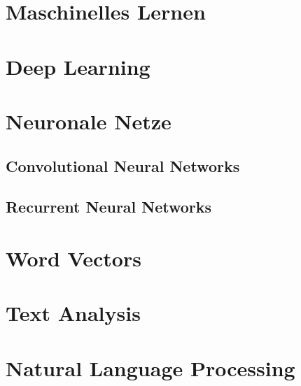 \section{Maschinelles Lernen}
\lipsum[1]

\section{Deep Learning}
\lipsum[2]

\section{Neuronale Netze}
\subsection{Convolutional Neural Networks}
\lipsum[3]
\subsection{Recurrent Neural Networks}
\lipsum[4]

\section{Word Vectors}
\lipsum[5]

\section{Text Analysis}
\lipsum[6]

\section{Natural Language Processing}
\lipsum[7]